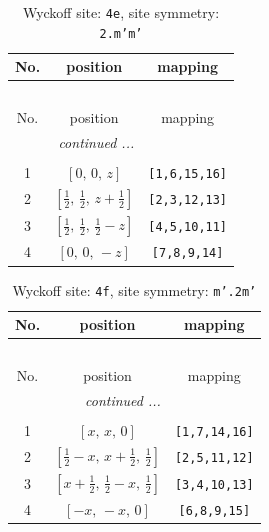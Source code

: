 \documentclass[fleqn,8pt]{jsarticle}
\begin{document}
\renewcommand{\arraystretch}{1.2}
\begin{longtable}{ccc}
\caption{Wyckoff site: {\tt 4e}, site symmetry: {\tt 2.m'm'}}
 \\
 \hline \hline
No. & position & mapping \\ \hline \endfirsthead

\multicolumn{2}{l}{\tablename\ \thetable{}} \\
 \hline \hline
No. & position & mapping \\ \hline \endhead

 \hline \hline
\multicolumn{2}{r}{\footnotesize\it continued ...} \\ \endfoot

 \hline \hline
\multicolumn{2}{r}{} \\ \endlastfoot

1 & $\left[ 0,\, 0,\, z \right]$ & {\tt [1,6,15,16]} \\ \hline
2 & $\left[ \frac{1}{2},\, \frac{1}{2},\, z + \frac{1}{2} \right]$ & {\tt [2,3,12,13]} \\ \hline
3 & $\left[ \frac{1}{2},\, \frac{1}{2},\, \frac{1}{2} - z \right]$ & {\tt [4,5,10,11]} \\ \hline
4 & $\left[ 0,\, 0,\, - z \right]$ & {\tt [7,8,9,14]} \\
\end{longtable}
\renewcommand{\arraystretch}{1.2}
\begin{longtable}{ccc}
\caption{Wyckoff site: {\tt 4f}, site symmetry: {\tt m'.2m'}}
 \\
 \hline \hline
No. & position & mapping \\ \hline \endfirsthead

\multicolumn{2}{l}{\tablename\ \thetable{}} \\
 \hline \hline
No. & position & mapping \\ \hline \endhead

 \hline \hline
\multicolumn{2}{r}{\footnotesize\it continued ...} \\ \endfoot

 \hline \hline
\multicolumn{2}{r}{} \\ \endlastfoot

1 & $\left[ x,\, x,\, 0 \right]$ & {\tt [1,7,14,16]} \\ \hline
2 & $\left[ \frac{1}{2} - x,\, x + \frac{1}{2},\, \frac{1}{2} \right]$ & {\tt [2,5,11,12]} \\ \hline
3 & $\left[ x + \frac{1}{2},\, \frac{1}{2} - x,\, \frac{1}{2} \right]$ & {\tt [3,4,10,13]} \\ \hline
4 & $\left[ - x,\, - x,\, 0 \right]$ & {\tt [6,8,9,15]} \\
\end{longtable}
\end{document}
